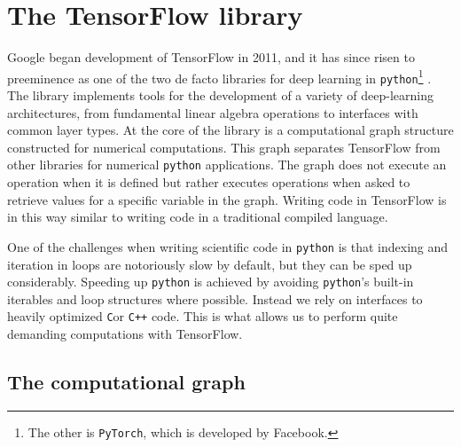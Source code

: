 \section{The TensorFlow library}\label{sec:TensorFlow}

Google began development of TensorFlow in 2011, and it has since risen to preeminence as one of the two de facto libraries for deep learning in \lstinline{python}\footnote{The other is \lstinline{PyTorch}, which is developed by Facebook.} \cite{tensorflow}. The library implements tools for the development of a variety of deep-learning architectures, from fundamental linear algebra operations to interfaces with common layer types. At the core of the library is a computational graph structure constructed for numerical computations. This graph separates TensorFlow from other libraries for numerical \lstinline{python} applications. The graph does not execute an operation when it is defined but rather executes operations when asked to retrieve values for a specific variable in the graph. Writing code in TensorFlow is in this way similar to writing code in a traditional compiled language.

One of the challenges when writing scientific code in \lstinline{python} is that indexing and iteration in loops are notoriously slow by default, but they can be sped up considerably. Speeding up \lstinline{python} is achieved by avoiding \lstinline{python}'s built-in iterables and loop structures where possible. Instead we rely on interfaces to heavily optimized \lstinline{C}or \lstinline{C++} code. This is what allows us to perform quite demanding computations with TensorFlow.

\subsection{The computational graph}


